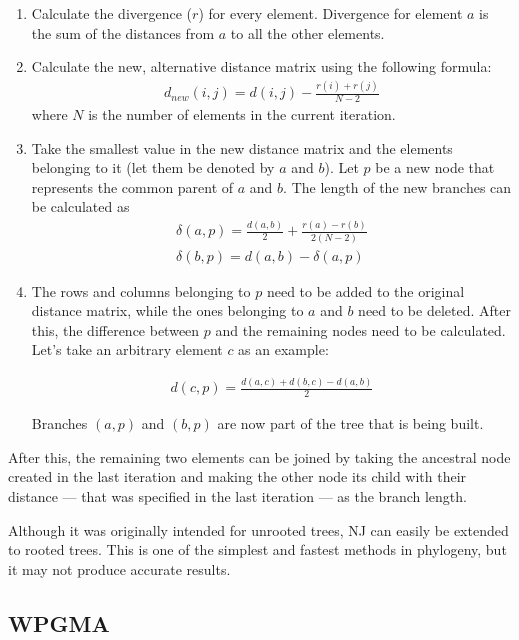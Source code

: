 \documentclass[11pt,twocolumn]{article}
\begin{document}
\begin{enumerate}
\item Calculate the divergence ($r$) for every element. Divergence for element $a$ is the sum of the distances from $a$ to all the other elements.

\item Calculate the new, alternative distance matrix using the following formula:
\begin{align}
d_{new}(i, j) = d(i, j) - \frac{r(i) + r(j)}{N - 2}
\end{align}
where $N$ is the number of elements in the current iteration.

\item Take the smallest value in the new distance matrix and the elements belonging to it (let them be denoted by $a$ and $b$). Let $p$ be a new node that represents the common parent of $a$ and $b$. The length of the new branches can be calculated as
\begin{align}
\delta(a, p) = \frac{d(a, b)}{2} + \frac{r(a) - r(b)}{2 (N - 2)} \\
\delta(b, p) = d(a, b) - \delta(a, p)
\end{align}

\item The rows and columns belonging to $p$ need to be added to the original distance matrix, while the ones belonging to $a$ and $b$ need to be deleted. After this, the difference between $p$ and the remaining nodes need to be calculated. Let's take an arbitrary element $c$ as an example:

\begin{align}
d(c, p) = \frac{d(a, c) + d(b, c) - d(a, b)}{2}
\end{align}

Branches $(a, p)$ and $(b, p)$ are now part of the tree that is being built.

\end{enumerate}

After this, the remaining two elements can be joined by taking the ancestral node created in the last iteration and making the other node its child with their distance — that was specified in the last iteration — as the branch length.

Although it was originally intended for unrooted trees, NJ can easily be extended to rooted trees. This is one of the simplest and fastest methods in phylogeny, but it may not produce accurate results.

\subsection{WPGMA}
\end{document}
